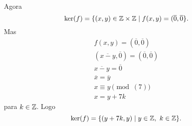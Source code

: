 \documentclass[12pt]{article}
\begin{document}
Agora
\[
	\ker(f) = \{(x,y) \in \mathbb{Z}\times\mathbb{Z} \mid f(x,y) = (\overline{0},\overline{0}\}.
\]
Mas
\begin{align*}
	f(x,y) = (\overline{0},\overline{0})\\
	(\overline{x-y},\overline{0}) = (\overline{0},\overline{0})\\
	\overline{x-y} = \overline{0}\\
	\overline{x} = \overline{y}\\
	x \equiv y \pmod(7)\\
	x = y + 7k
\end{align*}
para $k \in \mathbb{Z}$. Logo
\[
	\ker(f) = \{(y+7k,y) \mid y\in \mathbb{Z},\ k \in \mathbb{Z}\}.
\]
\end{document}
